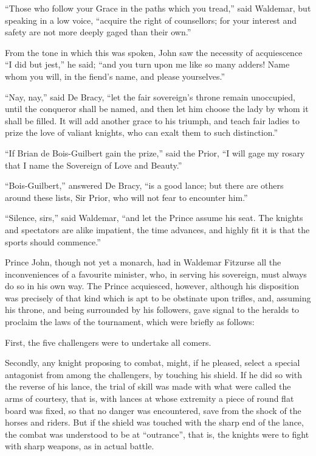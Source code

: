 ``Those who follow your Grace in the paths which you tread,'' said
Waldemar, but speaking in a low voice, ``acquire the right of
counsellors; for your interest and safety are not more deeply gaged than
their own.''

From the tone in which this was spoken, John saw the necessity of
acquiescence ``I did but jest,'' he said; ``and you turn upon me like so
many adders! Name whom you will, in the fiend's name, and please
yourselves.''

``Nay, nay,'' said De Bracy, ``let the fair sovereign's throne remain
unoccupied, until the conqueror shall be named, and then let him choose
the lady by whom it shall be filled. It will add another grace to his
triumph, and teach fair ladies to prize the love of valiant knights, who
can exalt them to such distinction.''

``If Brian de Bois-Guilbert gain the prize,'' said the Prior, ``I will
gage my rosary that I name the Sovereign of Love and Beauty.''

``Bois-Guilbert,'' answered De Bracy, ``is a good lance; but there are
others around these lists, Sir Prior, who will not fear to encounter
him.''

``Silence, sirs,'' said Waldemar, ``and let the Prince assume his seat.
The knights and spectators are alike impatient, the time advances, and
highly fit it is that the sports should commence.''

Prince John, though not yet a monarch, had in Waldemar Fitzurse all the
inconveniences of a favourite minister, who, in serving his sovereign,
must always do so in his own way. The Prince acquiesced, however,
although his disposition was precisely of that kind which is apt to be
obstinate upon trifles, and, assuming his throne, and being surrounded
by his followers, gave signal to the heralds to proclaim the laws of the
tournament, which were briefly as follows:

First, the five challengers were to undertake all comers.

Secondly, any knight proposing to combat, might, if he pleased, select a
special antagonist from among the challengers, by touching his shield.
If he did so with the reverse of his lance, the trial of skill was made
with what were called the arms of courtesy, that is, with lances at
whose extremity a piece of round flat board was fixed, so that no danger
was encountered, save from the shock of the horses and riders. But if
the shield was touched with the sharp end of the lance, the combat was
understood to be at ``outrance'', that is, the knights were to fight
with sharp weapons, as in actual battle.

